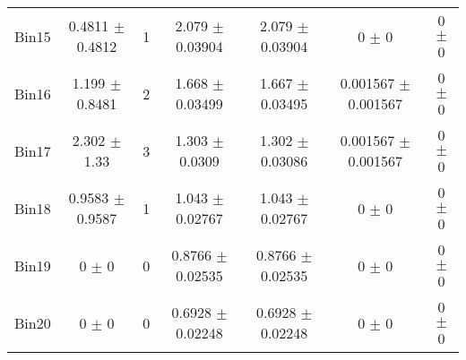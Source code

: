 \begin{tabular}{@{\extracolsep{4pt}}lcccccc@{}}
     Bin15 & 0.4811 $\pm$ 0.4812 & 1 & 2.079 $\pm$ 0.03904 & 2.079 $\pm$ 0.03904 & 0 $\pm$ 0 & 0 $\pm$ 0 \\ 
     Bin16 & 1.199 $\pm$ 0.8481 & 2 & 1.668 $\pm$ 0.03499 & 1.667 $\pm$ 0.03495 & 0.001567 $\pm$ 0.001567 & 0 $\pm$ 0 \\ 
     Bin17 & 2.302 $\pm$ 1.33 & 3 & 1.303 $\pm$ 0.0309 & 1.302 $\pm$ 0.03086 & 0.001567 $\pm$ 0.001567 & 0 $\pm$ 0 \\ 
     Bin18 & 0.9583 $\pm$ 0.9587 & 1 & 1.043 $\pm$ 0.02767 & 1.043 $\pm$ 0.02767 & 0 $\pm$ 0 & 0 $\pm$ 0 \\ 
     Bin19 & 0 $\pm$ 0 & 0 & 0.8766 $\pm$ 0.02535 & 0.8766 $\pm$ 0.02535 & 0 $\pm$ 0 & 0 $\pm$ 0 \\ 
     Bin20 & 0 $\pm$ 0 & 0 & 0.6928 $\pm$ 0.02248 & 0.6928 $\pm$ 0.02248 & 0 $\pm$ 0 & 0 $\pm$ 0 \\ 
\hline\hline
  \end{tabular}
